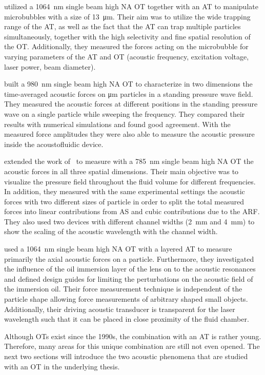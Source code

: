  utilized a \SI{1064}{\nm} single beam high NA OT together with 
an AT to manipulate microbubbles with a size of \SI{13}{\um}. Their aim was to 
utilize the wide trapping range of the AT, as well as the fact that the AT can 
trap multiple particles simultaneously, together with the high selectivity and 
fine spatial resolution of the OT. Additionally, they measured the forces 
acting on the microbubble for varying parameters of the AT and OT (acoustic 
frequency, excitation voltage, laser power, beam diameter).

 built a \SI{980}{\nm} single beam high NA OT to 
characterize in two dimensions the time-averaged acoustic forces on \si{\um} 
particles in a standing pressure wave field. They measured the acoustic forces 
at different positions in the standing pressure wave on a single particle while 
sweeping the frequency. They compared their results with numerical simulations 
and found good agreement. With the measured force amplitudes they were also 
able to measure the acoustic pressure inside the acoustofluidic device.

 extended the work of~ to measure 
with a \SI{785}{\nm} single beam high NA OT the acoustic forces in all three 
spatial dimensions. Their main objective was to visualize the pressure field 
throughout the fluid volume for different frequencies. In addition, they 
measured with the same experimental settings the acoustic forces with two 
different sizes of particle in order to split the total measured forces into 
linear contributions from AS and cubic contributions due to the ARF. They also 
used two devices with different channel widths (\SI{2}{\mm} and \SI{4}{\mm}) to 
show the scaling of the acoustic wavelength with the channel width.

 used a \SI{1064}{\nm} single beam high NA OT with a 
layered AT to measure primarily the axial acoustic forces on a particle. 
Furthermore, they investigated the influence of the oil immersion layer of the 
lens on to the acoustic resonances and defined design guides for limiting the 
perturbations on the acoustic field of the immersion oil. Their force 
measurement technique is independent of the particle shape allowing force 
measurements of arbitrary shaped small objects. Additionally, their driving 
acoustic transducer is transparent for the laser wavelength such that it can be 
placed in close proximity of the fluid chamber.

Although OTs exist since the 1990s, the combination with an AT is rather young. 
Therefore, many areas for this unique combination are still not even opened. 
The next two sections will introduce the two acoustic phenomena that are 
studied with an OT in the underlying thesis.

